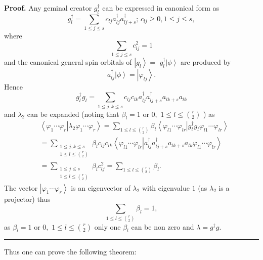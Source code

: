 \documentclass[aps,preprint]{revtex4}%
\newenvironment{proof}[1][Proof]{\noindent\textbf{#1.} }{\ \rule{0.5em}{0.5em}}
\begin{document}
\begin{proof}
Any geminal creator $g_{l}^{\dagger}$ can be expressed in canonical form as
\cite{OrtizWeiner2006,Mazziotti2001}
\begin{equation}
g_{l}^{\dagger}=\sum_{1\leq j\leq s}c_{lj}a_{lj}^{\dagger}a_{lj+s}^{\dagger
};\,c_{lj}\geq0,1\leq j\leq s,
\end{equation}
where
\begin{equation}
\sum_{1\leq j\leq s}c_{lj}^{2}=1
\end{equation}
and the canonical general spin orbitals of $\left\vert g_{l}\right\rangle =$
$g_{l}^{\dagger}\left\vert \phi\right\rangle $ are produced by
\begin{equation}
a_{lj}^{\dagger}\left\vert \phi\right\rangle =\left\vert \varphi
_{lj}\right\rangle .
\end{equation}
Hence
\begin{equation}
g_{l}^{\dagger}g_{l}=\sum_{1\leq j,k\leq s}c_{lj}c_{lk}a_{lj}^{\dagger
}a_{lj+s}^{\dagger}a_{lk+s}a_{lk}%
\end{equation}
and $\lambda_{2}$ can be expanded (noting that $\beta_{l}=1$ or $0,$ $1\leq
l\leq\binom{r}{2}$ ) as
\begin{align}
&  \left\langle \varphi_{1}\cdots\varphi_{r}\left\vert \lambda_{2}\varphi
_{1}\cdots\varphi_{r}\right.  \right\rangle =\sum_{1\leq l\leq\binom{r}{2}%
}\beta_{l}\left\langle \varphi_{l1}\cdots\varphi_{lr}\left\vert g_{l}%
^{\dagger}g_{l}\varphi_{l1}\cdots\varphi_{lr}\right.  \right\rangle \\
&  =\sum_{\substack{1\leq j,k\leq s\\1\leq l\leq\binom{r}{2}}}\beta_{l}%
c_{lj}c_{lk}\left\langle \varphi_{l1}\cdots\varphi_{lr}\left\vert
a_{lj}^{\dagger}a_{lj+s}^{\dagger}a_{lk+s}a_{lk}\varphi_{l1}\cdots\varphi
_{lr}\right.  \right\rangle \\
&  =\sum_{\substack{1\leq j\leq s\\1\leq l\leq\binom{r}{2}}}\beta_{l}%
c_{lj}^{2}=\sum_{1\leq l\leq\binom{r}{2}}\beta_{l}.
\end{align}
The vector $\left\vert \varphi_{1}\cdots\varphi_{r}\right\rangle $ is an
eigenvector of $\lambda_{2}$ with eigenvalue $1$ (as $\lambda_{2}$ is a
projector) thus
\begin{equation}
\sum_{1\leq l\leq\binom{r}{2}}\beta_{l}=1,
\end{equation}
as $\beta_{l}=1$ or $0,$ $1\leq l\leq\binom{r}{2}$ only one $\beta_{l}$ can be
non zero and $\lambda=g^{\dagger}g$.
\end{proof}

Thus one can prove the following theorem:
\end{document}
